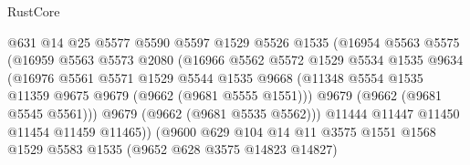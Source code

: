 \begin{lexlean}{RustCore}
\begin{coremodule}
                                @631
                                @14
                                @25
                                @5577
                                @5590
                                @5597
                                @1529
                                @5526
                                @1535
                                (@16954
                                  @5563
                                  @5575
                                  (@16959
                                    @5563
                                    @5573
                                    @2080
                                    (@16966
                                      @5562
                                      @5572
                                      @1529
                                      @5534
                                      @1535
                                      @9634
                                      (@16976
                                        @5561
                                        @5571
                                        @1529
                                        @5544
                                        @1535
                                        @9668
                                        (@11348
                                          @5554
                                          @1535
                                          @11359
                                          @9675
                                          @9679
                                          (@9662 (@9681 @5555 @1551)))
                                        @9679
                                        (@9662 (@9681 @5545 @5561)))
                                      @9679
                                      (@9662 (@9681 @5535 @5562)))
                                    @11444
                                    @11447
                                    @11450
                                    @11454
                                    @11459
                                    @11465))
                                (@9600
                                  @629
                                  @104
                                  @14
                                  @11
                                  @3575
                                  @1551
                                  @1568
                                  @1529
                                  @5583
                                  @1535
                                  (@9652 @628 @3575 @14823 @14827)

\end{coremodule}
\end{lexlean}
